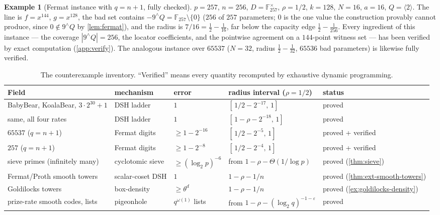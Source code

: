 \documentclass[11pt]{article}
\theoremstyle{definition}
\newtheorem{example}[example]{Example}
\newcommand{\F}{\mathbb F}
\newcommand{\eps}{\varepsilon}
\begin{document}
\begin{example}[Fermat instance with $q=n+1$, fully checked]\label{ex:257}
$p=257$, $n=256$, $D=\F_{257}^\times$, $\rho=1/2$, $k=128$, $N=16$, $a=16$, $Q=\langle2\rangle$.  The line is $f=x^{144}$, $g=x^{128}$, the bad set contains $-9^{\wedge}Q=\F_{257}\setminus\{0\}$ ($256$ of $257$ parameters; $0$ is the one value the construction provably cannot produce, since $0\notin9^{\wedge}Q$ by \cref{lem:fermat}), and the radius is $7/16=\tfrac12-\tfrac1{16}$, far below the capacity edge $\tfrac12-\tfrac1{256}$.  Every ingredient of this instance --- the coverage $|9^{\wedge}Q|=256$, the locator coefficients, and the pointwise agreement on a $144$-point witness set --- has been verified by exact computation (\cref{app:verify}).  The analogous instance over $65537$ ($N=32$, radius $\tfrac12-\tfrac1{32}$, $65536$ bad parameters) is likewise fully verified.
\end{example}

\begin{table}[ht]
\centering
\scriptsize
\setlength{\tabcolsep}{3pt}
\begin{tabular}{p{}p{}p{}p{}p{}}
\toprule
Field & mechanism & error & radius interval ($\rho=1/2$) & status \\
\midrule
BabyBear, KoalaBear, $3\cdot2^{30}{+}1$ & DSH ladder & $1$ & $[\,1/2-2^{-17},\,1]$ & proved \\
same, all four rates & DSH ladder & $1$ & $[\,1-\rho-2^{-18},\,1]$ & proved \\
$65537$ ($q=n+1$) & Fermat digits & $\ge1-2^{-16}$ & $[\,1/2-2^{-5},\,1]$ & proved + verified \\
$257$ ($q=n+1$) & Fermat digits & $\ge1-2^{-8}$ & $[\,1/2-2^{-4},\,1]$ & proved + verified \\
sieve primes (infinitely many) & cyclotomic sieve & $\ge(\log_2p)^{-6}$ & from $1-\rho-\Theta(1/\log p)$ & proved (\cref{thm:sieve}) \\
Fermat/Proth smooth towers & scalar-coset DSH & $1$ & $1-\rho-1/n$ & proved (\cref{thm:ext-smooth-towers}) \\
Goldilocks towers & box-density & $\ge\theta^d$ & $1-\rho-1/n$ & proved (\cref{ex:goldilocks-density}) \\
prize-rate smooth codes, lists & pigeonhole & $q^{\omega(1)}$ lists & from $1-\rho-(\log_2q)^{-1-\eps}$ & proved \\
\bottomrule
\end{tabular}
\caption{The counterexample inventory.  ``Verified'' means every quantity recomputed by exhaustive dynamic programming.}
\label{tab:inventory}
\end{table}
\end{document}
